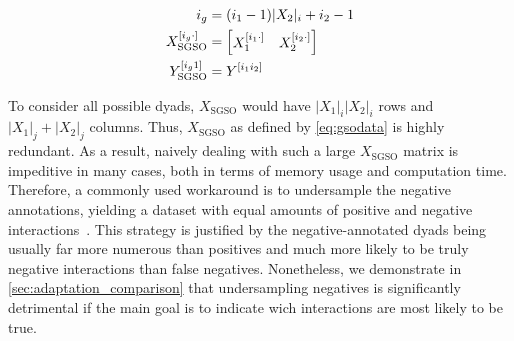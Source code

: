 %
\begin{equation}
    \begin{split}
    i_g &= (i_1-1)|X_2|_i+i_2-1\\
    X_\text{SGSO} ^{[i_g\cdot]} &= \begin{bmatrix} X_1 ^{[i_1\cdot]} & X_2^{[i_2\cdot]}\end{bmatrix}\\
    Y_\text{SGSO} ^{[i_g1]} &= Y^{[i_1i_2]}
    \end{split}
    \label{eq:gsodata}
\end{equation}

To consider all possible dyads, $X_\text{SGSO}$ would have $|X_1|_i|X_2|_i$ rows and $|X_1|_j+|X_2|_j$ columns. Thus, $X_\text{SGSO}$ as defined by \autoref{eq:gsodata} is highly redundant.
As a result, naively dealing with such a large $X_\text{SGSO}$ matrix is impeditive in many cases, both in terms of memory usage and computation time. Therefore, a commonly used workaround is to undersample the negative annotations, yielding a dataset with equal amounts of positive and negative interactions~\cite{ozturk2018deepdta,huang2020moltrans}.
This strategy is justified by the negative-annotated dyads being usually far more numerous than positives and much more likely to be truly negative interactions than false negatives.
Nonetheless, we demonstrate in \autoref{sec:adaptation_comparison} that undersampling negatives is significantly detrimental if the main goal is to indicate wich interactions are most likely to be true.

